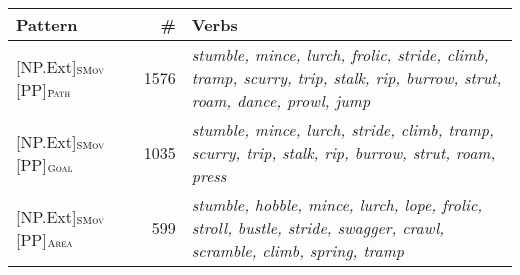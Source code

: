 \documentclass[output=paper,colorlinks,citecolor=brown]{langscibook}
\begin{document}
\begin{table}
\small
\begin{tabularx}{\textwidth}{lrQ} 
\lsptoprule
 Pattern & \# & Verbs \\ \midrule
{[NP.Ext]}$_{\text{\textsc{SMov}}}$ {[PP]}$_{\text{\textsc{Path}}}$  & 1576 & \textit{stumble, mince, lurch, frolic, stride, climb, tramp, scurry, trip, stalk, rip, burrow, strut, roam, dance, prowl, jump%
}\\

{[NP.Ext]}$_{\text{\textsc{SMov}}}$ {[PP]}$_{\text{\textsc{Goal}}}$  & 1035 & \textit{stumble, mince, lurch, stride, climb, tramp, scurry, trip, stalk, rip, burrow, strut, roam, press%
}\\

{[NP.Ext]}$_{\text{\textsc{SMov}}}$ {[PP]}$_{\text{\textsc{Area}}}$  & 599 & \textit{stumble, hobble, mince, lurch, lope, frolic, stroll, bustle, stride, swagger, crawl, scramble, climb, spring, tramp%
}
\\


\end{tabularx}
\end{table}
\end{document}
